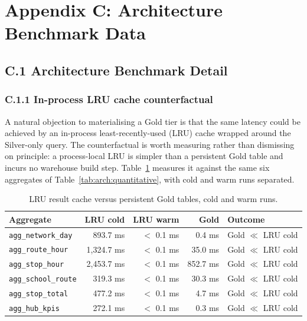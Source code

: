 \chapter*{Appendix C: Architecture Benchmark Data}
\label{appendix:supplementary}

\section*{C.1 Architecture Benchmark Detail}
\label{appendix:benchmark}

\subsection*{C.1.1 In-process LRU cache counterfactual}
\label{sec:solution:architecture:lru}

A natural objection to materialising a Gold tier is that the same
latency could be achieved by an in-process least-recently-used (LRU)
cache wrapped around the Silver-only query. The counterfactual is
worth measuring rather than dismissing on principle: a process-local
LRU is simpler than a persistent Gold table and incurs no warehouse
build step. Table~\ref{tab:arch:lru} measures it against the same six
aggregates of Table~\ref{tab:arch:quantitative}, with cold and warm
runs separated.

\begin{table}[!htbp]
\centering
\caption{LRU result cache versus persistent Gold tables, cold and warm runs.}
\label{tab:arch:lru}
\footnotesize
\renewcommand{\arraystretch}{1.20}
\begin{tabularx}{\linewidth}{p{4.8cm} r r r X}
\hline
\textbf{Aggregate} & \textbf{LRU cold} & \textbf{LRU warm} & \textbf{Gold} & \textbf{Outcome} \\
\hline
\texttt{agg\_network\_day}     &   893.7 ms &  $<$ 0.1 ms &    0.4 ms & Gold $\ll$ LRU cold \\
\texttt{agg\_route\_hour}      & 1{,}324.7 ms &  $<$ 0.1 ms &   35.0 ms & Gold $\ll$ LRU cold \\
\texttt{agg\_stop\_hour}       & 2{,}453.7 ms &  $<$ 0.1 ms &  852.7 ms & Gold $\ll$ LRU cold \\
\texttt{agg\_school\_route}    &   319.3 ms &  $<$ 0.1 ms &   30.3 ms & Gold $\ll$ LRU cold \\
\texttt{agg\_stop\_total}      &   477.2 ms &  $<$ 0.1 ms &    4.7 ms & Gold $\ll$ LRU cold \\
\texttt{agg\_hub\_kpis}        &   272.1 ms &  $<$ 0.1 ms &    0.3 ms & Gold $\ll$ LRU cold \\
\hline
\end{tabularx}
\end{table}


